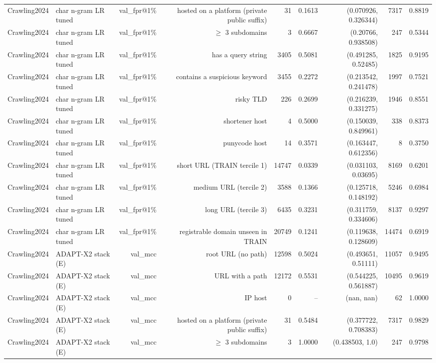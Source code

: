 \begin{table}[t]
\begin{tabular}{llrrrrrrr}
Crawling2024 & char n-gram LR tuned & val\_fpr@1\% & hosted on a platform (private public suffix) & 31 & 0.1613 & (0.070926, 0.326344) & 7317 & 0.8819 \\
Crawling2024 & char n-gram LR tuned & val\_fpr@1\% & $\geq$ 3 subdomains & 3 & 0.6667 & (0.20766, 0.938508) & 247 & 0.5344 \\
Crawling2024 & char n-gram LR tuned & val\_fpr@1\% & has a query string & 3405 & 0.5081 & (0.491285, 0.52485) & 1825 & 0.9195 \\
Crawling2024 & char n-gram LR tuned & val\_fpr@1\% & contains a suspicious keyword & 3455 & 0.2272 & (0.213542, 0.241478) & 1997 & 0.7521 \\
Crawling2024 & char n-gram LR tuned & val\_fpr@1\% & risky TLD & 226 & 0.2699 & (0.216239, 0.331275) & 1946 & 0.8551 \\
Crawling2024 & char n-gram LR tuned & val\_fpr@1\% & shortener host & 4 & 0.5000 & (0.150039, 0.849961) & 338 & 0.8373 \\
Crawling2024 & char n-gram LR tuned & val\_fpr@1\% & punycode host & 14 & 0.3571 & (0.163447, 0.612356) & 8 & 0.3750 \\
Crawling2024 & char n-gram LR tuned & val\_fpr@1\% & short URL (TRAIN tercile 1) & 14747 & 0.0339 & (0.031103, 0.03695) & 8169 & 0.6201 \\
Crawling2024 & char n-gram LR tuned & val\_fpr@1\% & medium URL (tercile 2) & 3588 & 0.1366 & (0.125718, 0.148192) & 5246 & 0.6984 \\
Crawling2024 & char n-gram LR tuned & val\_fpr@1\% & long URL (tercile 3) & 6435 & 0.3231 & (0.311759, 0.334606) & 8137 & 0.9297 \\
Crawling2024 & char n-gram LR tuned & val\_fpr@1\% & registrable domain unseen in TRAIN & 20749 & 0.1241 & (0.119638, 0.128609) & 14474 & 0.6919 \\
Crawling2024 & ADAPT-X2 stack (E) & val\_mcc & root URL (no path) & 12598 & 0.5024 & (0.493651, 0.51111) & 11057 & 0.9495 \\
Crawling2024 & ADAPT-X2 stack (E) & val\_mcc & URL with a path & 12172 & 0.5531 & (0.544225, 0.561887) & 10495 & 0.9619 \\
Crawling2024 & ADAPT-X2 stack (E) & val\_mcc & IP host & 0 & -- & (nan, nan) & 62 & 1.0000 \\
Crawling2024 & ADAPT-X2 stack (E) & val\_mcc & hosted on a platform (private public suffix) & 31 & 0.5484 & (0.377722, 0.708383) & 7317 & 0.9829 \\
Crawling2024 & ADAPT-X2 stack (E) & val\_mcc & $\geq$ 3 subdomains & 3 & 1.0000 & (0.438503, 1.0) & 247 & 0.9798 \\

\end{tabular}
\end{table}
